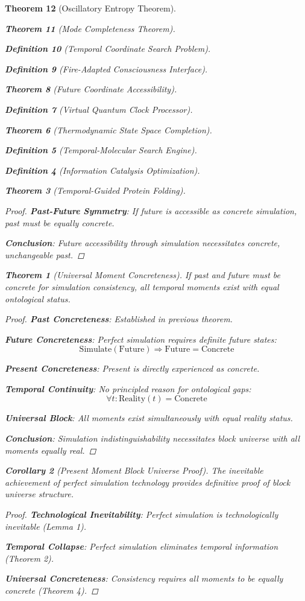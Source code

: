 \documentclass[12pt,a4paper]{article}
\newtheorem{theorem}{Theorem}[section]
\newtheorem{corollary}[theorem]{Corollary}
\newtheorem{definition}[theorem]{Definition}
\begin{document}
\begin{theorem}[Oscillatory Entropy Theorem]
\begin{theorem}[Mode Completeness Theorem]
\begin{enumerate}
\begin{definition}[Temporal Coordinate Search Problem]
\begin{algorithm}
\begin{definition}[Fire-Adapted Consciousness Interface]
\begin{theorem}[Future Coordinate Accessibility]
\begin{definition}[Virtual Quantum Clock Processor]
\begin{itemize}
\begin{itemize}
\begin{theorem}[Thermodynamic State Space Completion]
\begin{definition}[Temporal-Molecular Search Engine]
\begin{definition}[Information Catalysis Optimization]
\begin{algorithm}
\begin{theorem}[Temporal-Guided Protein Folding]
\begin{table}[h]
\begin{proof}
\textbf{Past-Future Symmetry}: If future is accessible as concrete simulation, past must be equally concrete.

\textbf{Conclusion}: Future accessibility through simulation necessitates concrete, unchangeable past.
\end{proof}

\begin{theorem}[Universal Moment Concreteness]
If past and future must be concrete for simulation consistency, all temporal moments exist with equal ontological status.
\end{theorem}

\begin{proof}
\textbf{Past Concreteness}: Established in previous theorem.

\textbf{Future Concreteness}: Perfect simulation requires definite future states:
$$\text{Simulate}(\text{Future}) \Rightarrow \text{Future} = \text{Concrete}$$

\textbf{Present Concreteness}: Present is directly experienced as concrete.

\textbf{Temporal Continuity}: No principled reason for ontological gaps:
$$\forall t: \text{Reality}(t) = \text{Concrete}$$

\textbf{Universal Block}: All moments exist simultaneously with equal reality status.

\textbf{Conclusion}: Simulation indistinguishability necessitates block universe with all moments equally real.
\end{proof}

\begin{corollary}[Present Moment Block Universe Proof]
The inevitable achievement of perfect simulation technology provides definitive proof of block universe structure.
\end{corollary}

\begin{proof}
\textbf{Technological Inevitability}: Perfect simulation is technologically inevitable (Lemma 1).

\textbf{Temporal Collapse}: Perfect simulation eliminates temporal information (Theorem 2).

\textbf{Universal Concreteness}: Consistency requires all moments to be equally concrete (Theorem 4).


\end{proof}
\end{table}
\end{theorem}
\end{algorithm}
\end{definition}
\end{definition}
\end{theorem}
\end{itemize}
\end{itemize}
\end{definition}
\end{theorem}
\end{definition}
\end{algorithm}
\end{definition}
\end{enumerate}
\end{theorem}
\end{theorem}
\end{document}
